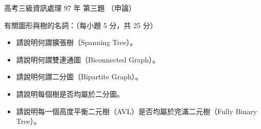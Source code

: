 \begin{pastexam}[label={px:gk3-097-ds-03}]{高考三級資訊處理 97 年 第三題}
（申論）

有關圖形與樹的名詞：（每小題 5 分，共 25 分）
\begin{itemize}[leftmargin=2.2em, nosep]
\item[㈠] 請說明何謂擴張樹（Spanning Tree）。
\item[㈡] 請說明何謂雙連通圖（Biconnected Graph）。
\item[㈢] 請說明何謂二分圖（Bipartite Graph）。
\item[㈣] 請說明每個樹是否均屬於二分圖。
\item[㈤] 請說明每一個高度平衡二元樹（AVL）是否均屬於完滿二元樹（Fully Binary Tree）。
\end{itemize}
\end{pastexam}

